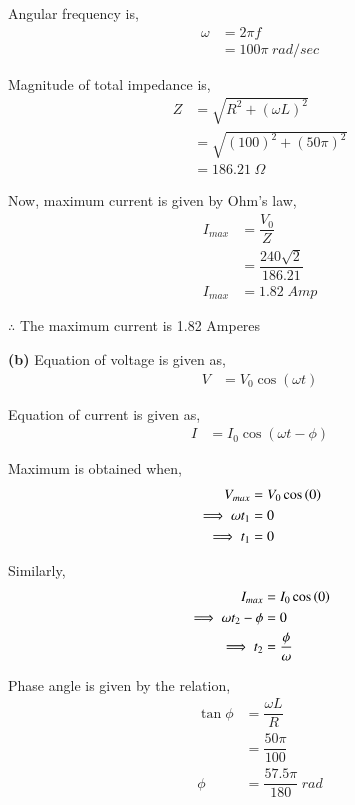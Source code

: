 \documentclass[journal,12pt,onecolumn]{IEEEtran}
\theoremstyle{remark}
\begin{document}
	Angular frequency is,
	\begin{align}
		\omega &= 2\pi f \\
			&= 100\pi \hspace{3pt} rad/sec
	\end{align}
	
	Magnitude of total impedance is,
	\begin{align}
		Z &= \sqrt{R^2 + (\omega L)^2}\\ 
		&= \sqrt{(100)^2 + (50\pi)^2}\\
		&= 186.21 \hspace{3pt}\Omega
	\end{align}
	
	Now, maximum current is given by Ohm's law,
	\begin{align}
		I_{max} &= \dfrac{V_0}{Z}\\[3pt]
		&= \dfrac{240\sqrt{2}}{186.21}\\[3pt] 
		I_{max} &= 1.82 \hspace{3pt} Amp
	\end{align}
	
	$\therefore$ \hspace{0.2cm} The maximum current is 1.82 Amperes
	\vspace{0.5cm}
	
	\textbf{(b)} Equation of voltage is given as,
	\begin{align}
		V &= V_0 \cos(\omega t)
	\end{align}

	Equation of current is given as,
	\begin{align}
		I &= I_0 \cos(\omega t - \phi)
	\end{align}
	
	Maximum is obtained when,
	\begin{align}
		V_{max} &= V_0 \cos \left(0\right)\\
		\implies \omega t_1 &= 0\\
		\implies t_1 &= 0
	\end{align}
	
	Similarly,
	\begin{align}
		I_{max} &= I_0 \cos \left(0\right)\\
		\implies \omega t_2 - \phi  &= 0\\
		\implies t_2 &= \dfrac{\phi}{\omega}
	\end{align}
	
	Phase angle is given by the relation,
	\begin{align}
		\tan \phi &= \dfrac{\omega L}{R}\\[6pt]
		&= \dfrac{50 \pi}{100}\\[6pt]
		\phi &= \dfrac{57.5 \pi}{180} \hspace{3pt} rad
	\end{align}
	
\end{document}
